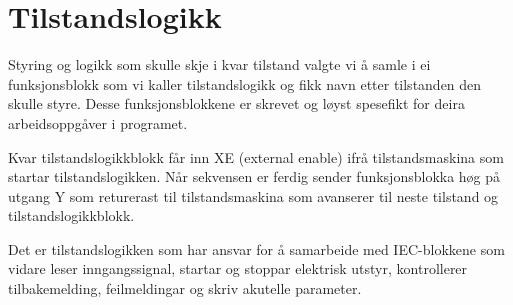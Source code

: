 \newpage
\section{Tilstandslogikk}
\thispagestyle{fancy}

Styring og logikk som skulle skje i kvar tilstand valgte vi å samle i ei funksjonsblokk som vi kaller tilstandslogikk og fikk navn etter tilstanden
den skulle styre. Desse funksjonsblokkene er skrevet og løyst spesefikt for deira arbeidsoppgåver i programet.

Kvar tilstandslogikkblokk får inn \gls{XE} (external enable) ifrå tilstandsmaskina som startar tilstandslogikken. Når sekvensen er ferdig sender
funksjonsblokka høg på utgang Y som returerast til tilstandsmaskina som avanserer til neste tilstand og tilstandslogikkblokk.

Det er tilstandslogikken som har ansvar for å samarbeide med IEC-blokkene som vidare
leser inngangssignal, startar og stoppar elektrisk utstyr, kontrollerer tilbakemelding, feilmeldingar og skriv akutelle parameter.

